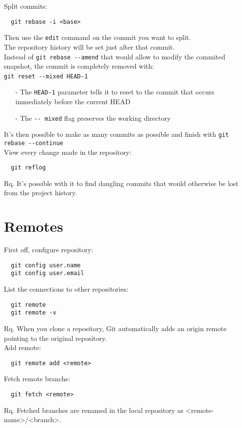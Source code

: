 \documentclass[french]{article}
\begin{document}
Split commits:
\begin{verbatim}
  git rebase -i <base>
\end{verbatim}
Then use the \verb|edit| command on the commit you want to split.\\
The repository history will be set just after that commit.\\
Instead of \verb|git rebase --amend| that would allow to modify the commited snapshot, the commit is completely removed with: \\ \verb|git reset --mixed HEAD|\textasciitilde \verb|1|
\begin{itemize}
  \item [-] The \verb|HEAD|\textasciitilde \verb|1| parameter tells it to reset to the commit that occurs immediately before the current HEAD
  \item [-] The \verb|-- mixed| flag preserves the working directory
\end{itemize}
It's then possible to make as many commits as possible and finish with \verb|git rebase --continue|\\

View every change made in the repository:
\begin{verbatim}
  git reflog
\end{verbatim}
Rq. It's possible with it to find dangling commits that would otherwise be lost from the project history.

\section{Remotes}

First off, configure repository:
\begin{verbatim}
  git config user.name
  git config user.email
\end{verbatim}

List the connections to other repositories:
\begin{verbatim}
  git remote
  git remote -v
\end{verbatim}
Rq. When you clone a repository, Git automatically adds an origin remote pointing to the original repository. \\

Add remote:
\begin{verbatim}
  git remote add <remote>
\end{verbatim}

Fetch remote branchs:
\begin{verbatim}
  git fetch <remote>
\end{verbatim}
Rq. Fetched branches are renamed in the local repository as <remote-name>/<branch>.\\
\end{document}
